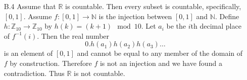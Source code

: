 \documentclass[../../Solutions.tex]{subfiles}
\begin{document}
\begin{itemize}
	\item [B.4] Assume that $\mathbb{R}$ is countable.
	Then every subset is countable, specifically, $[0,1]$.
	Assume $f:[0,1] \to \mathbb{N}$ is the injection between $[0,1]$ and $\mathbb{N}$.
	Define $h:\mathbb{Z}_{10} \to \mathbb{Z}_{10}$ by $h(k) = (k+1)\mod 10$.
	Let $a_i$ be the $i$th decimal place of $f^{-1}(i)$.
	Then the real number
	$$ 0.h(a_1)h(a_2)h(a_3)\dots $$
	is an element of $[0,1]$ and cannot be equal to any member of the domain of $f$ by construction.
	Therefore $f$ is not an injection and we have found a contradiction.
	Thus $\mathbb{R}$ is not countable.
\end{itemize}
\end{document}
